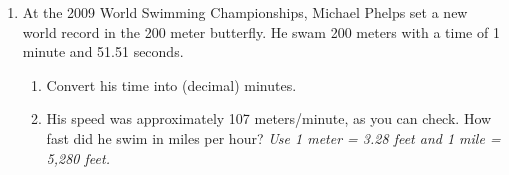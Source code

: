 \documentclass[12pt]{article}
\begin{document}
\begin{enumerate}
\newpage

\item At the 2009 World Swimming Championships, Michael Phelps set a new world record in the 200 meter butterfly.  He swam 200 meters with a time of 1 minute and 51.51 seconds.

\begin{enumerate}
\item Convert his time into (decimal) minutes.
\vfill
\vfill
\item His speed was approximately 107 meters/minute, as you can check.  How fast did he swim in miles per hour?  \emph{Use 1 meter = 3.28 feet and 1 mile = 5,280 feet.}
\vfill
\vfill
\vfill
\end{enumerate}

\end{enumerate}
\end{document}
